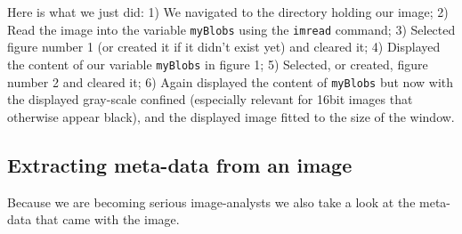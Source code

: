 Here is what we just did: 1) We navigated to the directory holding our image; 2) Read the image into the variable \lstinline{myBlobs} using the \lstinline{imread} command; 3) Selected figure number 1 (or created it if it didn't exist yet) and cleared it; 4) Displayed the content of our variable \lstinline{myBlobs} in figure 1; 5) Selected, or created, figure number 2 and cleared it; 6) Again displayed the content of \lstinline{myBlobs} but now with the displayed gray-scale confined (especially relevant for 16bit images that otherwise appear black), and the displayed image fitted to the size of the window.

\subsection{Extracting meta-data from an image}
Because we are becoming serious image-analysts we also take a look at the meta-data that came with the image.